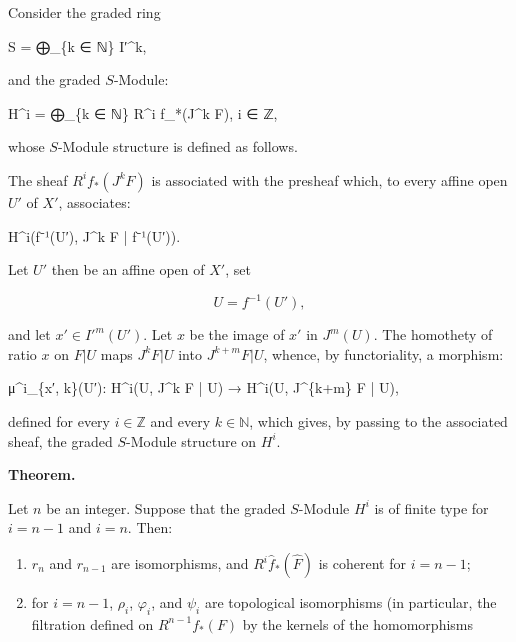 \documentclass[
]{article}
\newenvironment{Shaded}{}{}
\newcommand{\NormalTok}[1]{#1}
\begin{document}
Consider the graded ring

\begin{Shaded}
\begin{Highlighting}[]
\NormalTok{S = ⨁\_\{k ∈ ℕ\} I′\^{}k,}
\end{Highlighting}
\end{Shaded}

and the graded \(S\)-Module:

\begin{Shaded}
\begin{Highlighting}[]
\NormalTok{H\^{}i = ⨁\_\{k ∈ ℕ\} R\^{}i f\_*(J\^{}k F),    i ∈ ℤ,}
\end{Highlighting}
\end{Shaded}

whose \(S\)-Module structure is defined as follows.

The sheaf \(R^{i} f_{*}(J^{k} F)\) is associated with the presheaf
which, to every affine open \(U'\) of \(X'\), associates:

\begin{Shaded}
\begin{Highlighting}[]
\NormalTok{H\^{}i(f⁻¹(U′), J\^{}k F | f⁻¹(U′)).}
\end{Highlighting}
\end{Shaded}

Let \(U'\) then be an affine open of \(X'\), set

\[
U = f^{-1}(U'),
\]

and let \(x' \in I'^{m}(U')\). Let \(x\) be the image of \(x'\) in
\(J^{m}(U)\). The homothety of ratio \(x\) on \(F | U\) maps
\(J^{k} F | U\) into \(J^{k+m} F | U\), whence, by functoriality, a
morphism:

\begin{Shaded}
\begin{Highlighting}[]
\NormalTok{μ\^{}i\_\{x′, k\}(U′): H\^{}i(U, J\^{}k F | U) → H\^{}i(U, J\^{}\{k+m\} F | U),}
\end{Highlighting}
\end{Shaded}

defined for every \(i \in \mathbb{Z}\) and every \(k \in \mathbb{N}\),
which gives, by passing to the associated sheaf, the graded \(S\)-Module
structure on \(H^{i}\).

\textbf{Theorem.}

Let \(n\) be an integer. Suppose that the graded \(S\)-Module \(H^{i}\)
is of finite type for \(i = n - 1\) and \(i = n\). Then:

\begin{enumerate}
\def\labelenumi{(\arabic{enumi})}
\setcounter{enumi}{-1}
\item
  \(r_{n}\) and \(r_{n-1}\) are isomorphisms, and
  \(R^{i} \hat{f}_{*}(\hat{F})\) is coherent for \(i = n - 1\);
\item
  for \(i = n - 1\), \(\rho_{i}\), \(\varphi_{i}\), and \(\psi_{i}\) are
  topological isomorphisms (in particular, the filtration defined on
  \(R^{n-1} f_{*}(F)\) by the kernels of the homomorphisms
\end{enumerate}
\end{document}
